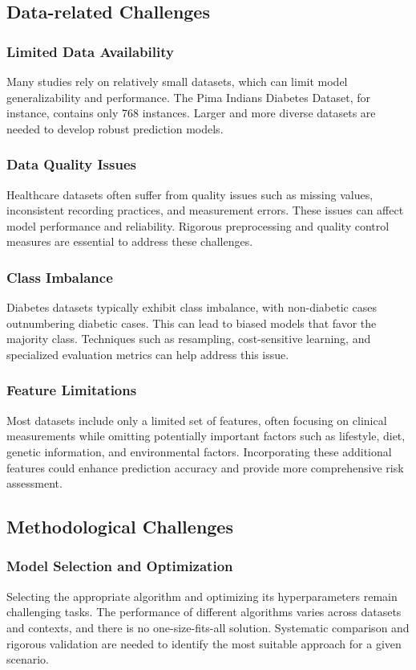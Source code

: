 \documentclass[journal]{IEEEtran}
\begin{document}
\subsection{Data-related Challenges}
\subsubsection{Limited Data Availability}
Many studies rely on relatively small datasets, which can limit model generalizability and performance. The Pima Indians Diabetes Dataset, for instance, contains only 768 instances. Larger and more diverse datasets are needed to develop robust prediction models.

\subsubsection{Data Quality Issues}
Healthcare datasets often suffer from quality issues such as missing values, inconsistent recording practices, and measurement errors. These issues can affect model performance and reliability. Rigorous preprocessing and quality control measures are essential to address these challenges.

\subsubsection{Class Imbalance}
Diabetes datasets typically exhibit class imbalance, with non-diabetic cases outnumbering diabetic cases. This can lead to biased models that favor the majority class. Techniques such as resampling, cost-sensitive learning, and specialized evaluation metrics can help address this issue.

\subsubsection{Feature Limitations}
Most datasets include only a limited set of features, often focusing on clinical measurements while omitting potentially important factors such as lifestyle, diet, genetic information, and environmental factors. Incorporating these additional features could enhance prediction accuracy and provide more comprehensive risk assessment.

\subsection{Methodological Challenges}
\subsubsection{Model Selection and Optimization}
Selecting the appropriate algorithm and optimizing its hyperparameters remain challenging tasks. The performance of different algorithms varies across datasets and contexts, and there is no one-size-fits-all solution. Systematic comparison and rigorous validation are needed to identify the most suitable approach for a given scenario.
\end{document}
